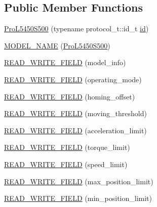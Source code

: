 \subsection*{Public Member Functions}
\begin{DoxyCompactItemize}
\item 
\hyperlink{classdynamixel_1_1servos_1_1_pro_l5450_s500_ae9bdf7cab008ea31d42b0d88808c3ca2}{Pro\+L5450\+S500} (typename protocol\+\_\+t\+::id\+\_\+t \hyperlink{classdynamixel_1_1servos_1_1_servo_a2d022081672e25a7bb57b76706e1cc57}{id})
\item 
\hyperlink{classdynamixel_1_1servos_1_1_pro_l5450_s500_abbd7b4b8460d611b8789d95129da5a7b}{M\+O\+D\+E\+L\+\_\+\+N\+A\+M\+E} (\hyperlink{classdynamixel_1_1servos_1_1_pro_l5450_s500}{Pro\+L5450\+S500})
\item 
\hyperlink{classdynamixel_1_1servos_1_1_pro_l5450_s500_af52cf5d3c5441dd5d1ab393e9c41b9c9}{R\+E\+A\+D\+\_\+\+W\+R\+I\+T\+E\+\_\+\+F\+I\+E\+L\+D} (model\+\_\+info)
\item 
\hyperlink{classdynamixel_1_1servos_1_1_pro_l5450_s500_ab9590b9cc75b4322beaf44d5f0f88217}{R\+E\+A\+D\+\_\+\+W\+R\+I\+T\+E\+\_\+\+F\+I\+E\+L\+D} (operating\+\_\+mode)
\item 
\hyperlink{classdynamixel_1_1servos_1_1_pro_l5450_s500_a82ec7d8dd716b5b530411928bd02a8a4}{R\+E\+A\+D\+\_\+\+W\+R\+I\+T\+E\+\_\+\+F\+I\+E\+L\+D} (homing\+\_\+offset)
\item 
\hyperlink{classdynamixel_1_1servos_1_1_pro_l5450_s500_a82e5d74a40b67fd1a3f902f64508be0c}{R\+E\+A\+D\+\_\+\+W\+R\+I\+T\+E\+\_\+\+F\+I\+E\+L\+D} (moving\+\_\+threshold)
\item 
\hyperlink{classdynamixel_1_1servos_1_1_pro_l5450_s500_a42e4d20be67772bf55bc0820863447db}{R\+E\+A\+D\+\_\+\+W\+R\+I\+T\+E\+\_\+\+F\+I\+E\+L\+D} (acceleration\+\_\+limit)
\item 
\hyperlink{classdynamixel_1_1servos_1_1_pro_l5450_s500_aa32a61533d4206f4f2ec871b0067ddc5}{R\+E\+A\+D\+\_\+\+W\+R\+I\+T\+E\+\_\+\+F\+I\+E\+L\+D} (torque\+\_\+limit)
\item 
\hyperlink{classdynamixel_1_1servos_1_1_pro_l5450_s500_a0feb9781b6b379c7ce8237798d3e7cdf}{R\+E\+A\+D\+\_\+\+W\+R\+I\+T\+E\+\_\+\+F\+I\+E\+L\+D} (speed\+\_\+limit)
\item 
\hyperlink{classdynamixel_1_1servos_1_1_pro_l5450_s500_a53c4a10a0b81b4be21c18955159de1f5}{R\+E\+A\+D\+\_\+\+W\+R\+I\+T\+E\+\_\+\+F\+I\+E\+L\+D} (max\+\_\+position\+\_\+limit)
\item 
\hyperlink{classdynamixel_1_1servos_1_1_pro_l5450_s500_aa43ef3a5efceb293398808c2b921d37b}{R\+E\+A\+D\+\_\+\+W\+R\+I\+T\+E\+\_\+\+F\+I\+E\+L\+D} (min\+\_\+position\+\_\+limit)

\end{DoxyCompactItemize}
